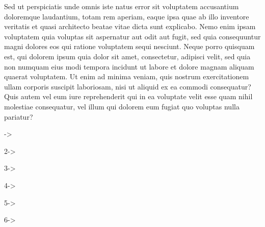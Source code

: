 \documentclass{article}
\begin{document}
\beginnumbering
\setcounter{pstart}{222}
\pstart
Sed ut perspiciatis unde omnis iste natus error sit voluptatem accusantium doloremque laudantium, totam rem aperiam, eaque ipsa quae ab illo inventore veritatis et quasi architecto beatae vitae dicta sunt explicabo. Nemo enim ipsam voluptatem quia voluptas sit aspernatur aut odit aut fugit, sed quia consequuntur magni dolores eos qui ratione voluptatem sequi nesciunt. Neque porro quisquam est, qui dolorem ipsum quia dolor sit amet, consectetur, adipisci velit, sed quia non numquam eius modi tempora incidunt ut labore et dolore magnam aliquam quaerat voluptatem. Ut enim ad minima veniam, quis nostrum exercitationem ullam corporis suscipit laboriosam, nisi ut aliquid ex ea commodi consequatur? \startsub Quis autem vel eum iure reprehenderit qui in ea voluptate velit esse quam nihil molestiae consequatur, vel illum qui dolorem eum fugiat quo voluptas nulla pariatur?
\pend
\endnumbering

-> 

2-> 

3-> 

4-> 

5-> 

6-> 
\end{document}
